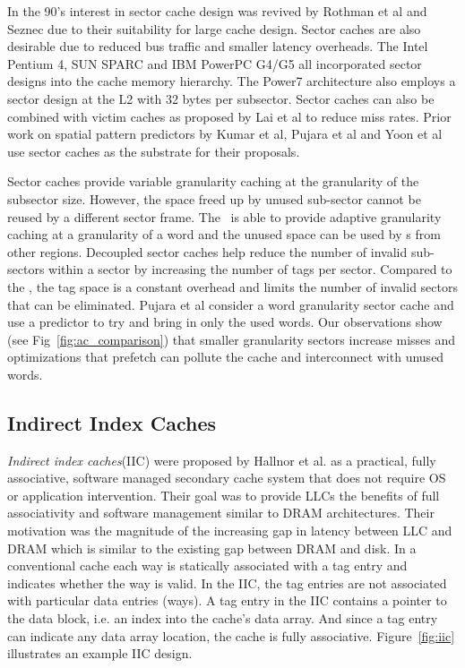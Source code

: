 In the 90's interest in sector cache design was revived by Rothman et al\cite{Rothman_Smith_2000} and Seznec\cite{Seznec-decoupled-sector-cache-isca, seznec:inria-00074588} due to their suitability for large cache design. Sector caches are also desirable due to reduced bus traffic and smaller latency overheads.  The Intel Pentium 4, SUN SPARC and IBM PowerPC G4/G5 all incorporated sector designs into the cache memory hierarchy. The Power7 architecture also employs a sector design at the L2 with 32 bytes per subsector. Sector caches can also be combined with victim caches as proposed by Lai et al\cite{Lai-victim-sector} to reduce miss rates. Prior work on spatial pattern predictors by Kumar et al\cite{kumar-isca-1998}, Pujara et al\cite{pujara-hpca-2006} and Yoon et al\cite{Yoon_Jeong_Erez_2011, yoon2012dgms} use sector caches as the substrate for their proposals.

Sector caches provide variable granularity caching at the granularity of the subsector size. However, the space freed up by unused sub-sector cannot be reused by a different sector frame. The \AC\ is able to provide adaptive granularity caching at a granularity of a word and the unused space can be used by \AB{}s from other regions. Decoupled sector caches\cite{Seznec-decoupled-sector-cache-isca} help reduce the number of invalid sub-sectors within a sector by increasing the number of tags per sector. Compared to the \AC{}, the tag space is a constant overhead and limits the number of invalid sectors that can be eliminated. Pujara et al\cite{pujara-hpca-2006} consider a word granularity sector cache and use a predictor to try and bring in only the used words. Our observations show (see Fig~\ref{fig:ac_comparison}) that smaller granularity sectors increase misses and optimizations that prefetch can pollute the cache and interconnect with unused words.

\subsection{Indirect Index Caches}
\label{sec:indirect_index_caches}
\textit{Indirect index caches}(IIC) were proposed by Hallnor et al.\cite{Hallnor_Reinhardt_2000} as a practical, fully associative, software managed secondary cache system that does not require OS or application intervention. Their goal was to provide LLCs the benefits of full associativity and software management similar to DRAM architectures. Their motivation was the magnitude of the increasing gap in latency between LLC and DRAM which is similar to the existing gap between DRAM and disk. In a conventional cache each way is statically associated with a tag entry and indicates whether the way is valid. In the IIC, the tag entries are not associated with particular data entries (ways). A tag entry in the IIC contains a pointer to the data block, i.e. an index into the cache's data array. And since a tag entry can indicate any data array location, the cache is fully associative. Figure~\ref{fig:iic} illustrates an example IIC design. 

